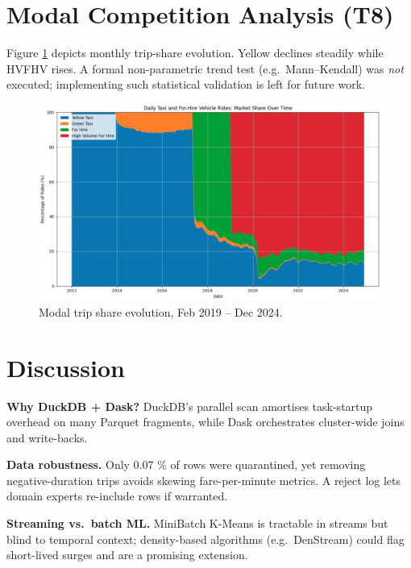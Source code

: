 \documentclass[conference]{IEEEtran}
\begin{document}

  \section{Modal Competition Analysis (T8)}\label{sec:impact}
  Figure \ref{fig:mode-evolution} depicts monthly trip-share evolution.
  Yellow declines steadily while HVFHV rises.
  A formal non-parametric trend test (e.g.\ Mann–Kendall) was \emph{not}
  executed; implementing such statistical validation is left for future
  work.

  \begin{figure}[htbp]
    \centering
    \includegraphics[width=0.88\linewidth]{figures/mode_evolution.png}
    \caption{Modal trip share evolution, Feb 2019 – Dec 2024.}
    \label{fig:mode-evolution}
  \end{figure}

  \section{Discussion}\label{sec:discussion}
  \textbf{Why DuckDB + Dask?}
  DuckDB’s parallel scan amortises task-startup overhead on many Parquet
  fragments, while Dask orchestrates cluster-wide joins and write-backs.

  \textbf{Data robustness.}
  Only 0.07 \% of rows were quarantined, yet removing
  negative-duration trips avoids skewing fare-per-minute metrics.  A
  reject log lets domain experts re-include rows if warranted.

  \textbf{Streaming vs.\ batch ML.}
  MiniBatch K-Means is tractable in streams but blind to temporal
  context; density-based algorithms (e.g.\ DenStream) could flag
  short-lived surges and are a promising extension.
\end{document}
